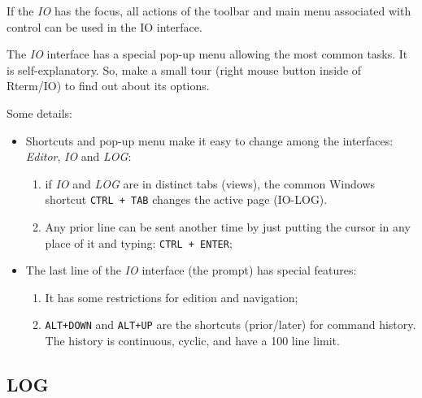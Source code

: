 If the \textit{IO} has the focus, all actions of the \RR{} toolbar and main menu
associated with control \RR{} can be used in the IO interface.

The \textit{IO} interface has a special pop-up menu allowing the most common
tasks. It is self-explanatory. So, make a small tour (right mouse button inside
of Rterm/IO) to find out about its options.

Some details:

\begin{itemize}
  \item Shortcuts and pop-up menu make it easy to change among the interfaces:
    \textit{Editor}, \textit{IO} and \textit{LOG}:
    \begin{enumerate}
      \item if \textit{IO} and \textit{LOG} are in distinct tabs (views), the
        common Windows shortcut \texttt{CTRL + TAB} changes the active page (IO-LOG).
      \item Any prior line can be sent another time by just putting the cursor
        in any place of it and typing: \texttt{CTRL + ENTER};
    \end{enumerate}
  \item The last line of the \textit{IO} interface (the prompt) has special features:
    \begin{enumerate}
      \item It has some restrictions for edition and navigation;
      \item \texttt{ALT+DOWN} and \texttt{ALT+UP} are the shortcuts (prior/later)
        for command history. The history is continuous, cyclic, and have a 100
        line limit.
    \end{enumerate}
\end{itemize}


\hypertarget{working_rterm_log}{}
\subsection{LOG}


